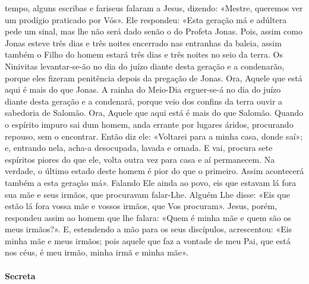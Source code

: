 \begin{paracol}{2}
{ tempo, alguns escribas e fariseus falaram a Jesus, dizendo: «Mestre, queremos ver um prodígio praticado por Vós». Ele respondeu: «Esta geração má e adúltera pede um sinal, mas lhe não será dado senão o do Profeta Jonas. Pois, assim como Jonas esteve três dias e três noites encerrado nas entranhas da baleia, assim também o Filho do homem estará três dias e três noites no seio da terra. Os Ninivitas levantar-se-ão no dia do juízo diante desta geração e a condenarão, porque eles fizeram penitência depois da pregação de Jonas. Ora, Aquele que está aqui é mais do que Jonas. A rainha do Meio-Dia erguer-se-á no dia do juízo diante desta geração e a condenará, porque veio dos confins da terra ouvir a sabedoria de Salomão. Ora, Aquele que aqui está é mais do que Salomão. Quando o espírito impuro sai dum homem, anda errante por lugares áridos, procurando repouso, sem o encontrar. Então diz ele: «Voltarei para a minha casa, donde saí»; e, entrando nela, acha-a desocupada, lavada e ornada. E vai, procura sete espíritos piores do que ele, volta outra vez para casa e aí permanecem. Na verdade, o último estado deste homem é pior do que o primeiro. Assim acontecerá também a esta geração má». Falando Ele ainda ao povo, eis que estavam lá fora sua mãe e seus irmãos, que procuravam falar-Lhe. Alguém Lhe disse: «Eis que estão lá fora vossa mãe e vossos irmãos, que Vos procuram». Jesus, porém, respondeu assim ao homem que lhe falara: «Quem é minha mãe e quem são os meus irmãos?». E, estendendo a mão para os seus discípulos, acrescentou: «Eis minha mãe e meus irmãos; pois aquele que faz a vontade de meu Pai, que está nos céus, é meu irmão, minha irmã e minha mãe».
}\end{paracol}

\begin{paracol}{2}\switchcolumn{}\end{paracol}

\paragraph{Secreta}
\begin{paracol}{2}\switchcolumn{}\end{paracol}

